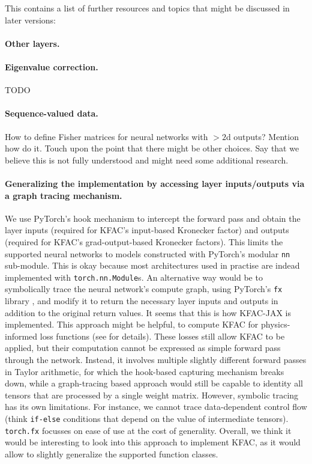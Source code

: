 This contains a list of further resources and topics that might be discussed in later versions:

\paragraph{Other layers.}

\paragraph{Eigenvalue correction.} TODO

\paragraph{Sequence-valued data.}
How to define Fisher matrices for neural networks with $>2$d outputs?
Mention how \cite{grosse2023studying} do it.
Touch upon the point that there might be other choices.
Say that we believe this is not fully understood and might need some additional research.

\paragraph{Generalizing the implementation by accessing layer inputs/outputs via a graph tracing mechanism.}
We use PyTorch's hook mechanism to intercept the forward pass and obtain the layer inputs (required for KFAC's input-based Kronecker factor) and outputs (required for KFAC's grad-output-based Kronecker factors).
This limits the supported neural networks to models constructed with PyTorch's modular \texttt{nn} sub-module.
This is okay because most architectures used in practise are indead implemented with \texttt{torch.nn.Module}s.
An alternative way would be to symbolically trace the neural network's compute graph, \eg using PyTorch's \texttt{fx} library \cite{reed2022torch}, and modify it to return the necessary layer inputs and outputs in addition to the original return values.
It seems that this is how KFAC-JAX \cite{botev2022kfac-jax} is implemented.
This approach might be helpful, \eg to compute KFAC for physics-informed loss functions (see \citet{dangel2024kroneckerfactored} for details).
These losses still allow KFAC to be applied, but their computation cannot be expressed as simple forward pass through the network.
Instead, it involves multiple slightly different forward passes in Taylor arithmetic, for which the hook-based capturing mechanism breaks down, while a graph-tracing based approach would still be capable to identity all tensors that are processed by a single weight matrix.
However, symbolic tracing has its own limitations.
For instance, we cannot trace data-dependent control flow (think \texttt{if-else} conditions that depend on the value of intermediate tensors).
\texttt{torch.fx} focusses on ease of use at the cost of generality.
Overall, we think it would be interesting to look into this approach to implement KFAC, as it would allow to slightly generalize the supported function classes.

